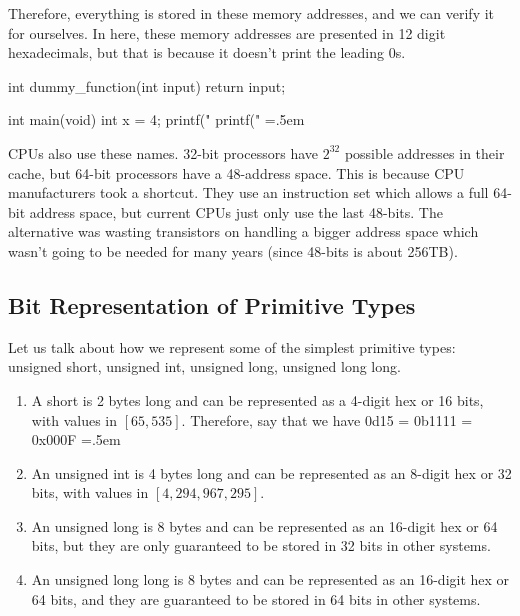 \documentclass{article}
\theoremstyle{definition}
\newenvironment{cverbatim}
   {\SaveVerbatim{cverb}}
   {\endSaveVerbatim
    \flushleft\fboxrule=0pt\fboxsep=.5em
    \colorbox{cverbbg}{%
      \makebox[\dimexpr\linewidth-2\fboxsep][l]{\BUseVerbatim{cverb}}%
    }
    \endflushleft
  }
\begin{document}
  Therefore, everything is stored in these memory addresses, and we can verify it for ourselves. In here, these memory addresses are presented in 12 digit hexadecimals, but that is because it doesn't print the leading 0s. 

  \begin{cverbatim} 
    int dummy_function(int input) {
      return input; 
    }

    int main(void) {
      int x = 4; 
      printf("%
      printf("%
    }
  \end{cverbatim}

  CPUs also use these names. 32-bit processors have $2^{32}$ possible addresses in their cache, but 64-bit processors have a 48-address space. This is because CPU manufacturers took a shortcut. They use an instruction set which allows a full 64-bit address space, but current CPUs just only use the last 48-bits. The alternative was wasting transistors on handling a bigger address space which wasn't going to be needed for many years (since 48-bits is about 256TB).   

  \subsection{Bit Representation of Primitive Types}

    Let us talk about how we represent some of the simplest primitive types: unsigned short, unsigned int, unsigned long, unsigned long long.
    \begin{enumerate} 
      \item A short is 2 bytes long and can be represented as a 4-digit hex or 16 bits, with values in $[65,535]$. Therefore, say that we have 
        \begin{cverbatim} 
          0d15 = 0b1111 = 0x000F
        \end{cverbatim}

      \item An unsigned int is 4 bytes long and can be represented as an 8-digit hex or 32 bits, with values in $[4,294,967,295]$. 
      \item An unsigned long is 8 bytes and can be represented as an 16-digit hex or 64 bits, but they are only guaranteed to be stored in 32 bits in other systems. 
      \item An unsigned long long is 8 bytes and can be represented as an 16-digit hex or 64 bits, and they are guaranteed to be stored in 64 bits in other systems. 
    \end{enumerate} 
\end{document}
